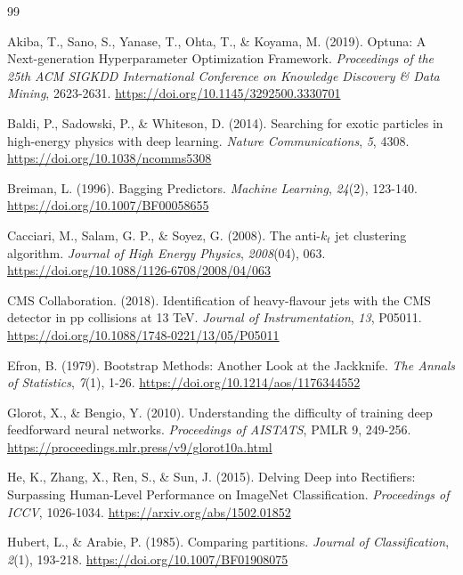 \documentclass[12pt,a4paper]{article}
\begin{document}
\newpage
{}
\begin{thebibliography}{99}
\setlength{\itemsep}{0.5em}

Akiba, T., Sano, S., Yanase, T., Ohta, T., \& Koyama, M. (2019). Optuna: A Next-generation
Hyperparameter Optimization Framework. \emph{Proceedings of the 25th ACM SIGKDD International
Conference on Knowledge Discovery \& Data Mining}, 2623-2631.
\url{https://doi.org/10.1145/3292500.3330701}

Baldi, P., Sadowski, P., \& Whiteson, D. (2014). Searching for exotic particles in high-energy
physics with deep learning. \emph{Nature Communications}, \emph{5}, 4308.
\url{https://doi.org/10.1038/ncomms5308}

Breiman, L. (1996). Bagging Predictors. \emph{Machine Learning}, \emph{24}(2), 123-140.
\url{https://doi.org/10.1007/BF00058655}

Cacciari, M., Salam, G. P., \& Soyez, G. (2008). The anti-$k_t$ jet clustering algorithm.
\emph{Journal of High Energy Physics}, \emph{2008}(04), 063.
\url{https://doi.org/10.1088/1126-6708/2008/04/063}

CMS Collaboration. (2018). Identification of heavy-flavour jets with the CMS detector in pp
collisions at 13 TeV. \emph{Journal of Instrumentation}, \emph{13}, P05011.
\url{https://doi.org/10.1088/1748-0221/13/05/P05011}

Efron, B. (1979). Bootstrap Methods: Another Look at the Jackknife. \emph{The Annals of
Statistics}, \emph{7}(1), 1-26. \url{https://doi.org/10.1214/aos/1176344552}

Glorot, X., \& Bengio, Y. (2010). Understanding the difficulty of training deep feedforward neural
networks. \emph{Proceedings of AISTATS}, PMLR 9, 249-256.
\url{https://proceedings.mlr.press/v9/glorot10a.html}

He, K., Zhang, X., Ren, S., \& Sun, J. (2015). Delving Deep into Rectifiers: Surpassing
Human-Level Performance on ImageNet Classification. \emph{Proceedings of ICCV}, 1026-1034.
\url{https://arxiv.org/abs/1502.01852}

Hubert, L., \& Arabie, P. (1985). Comparing partitions. \emph{Journal of Classification},
\emph{2}(1), 193-218. \url{https://doi.org/10.1007/BF01908075}


\end{thebibliography}
\end{document}
